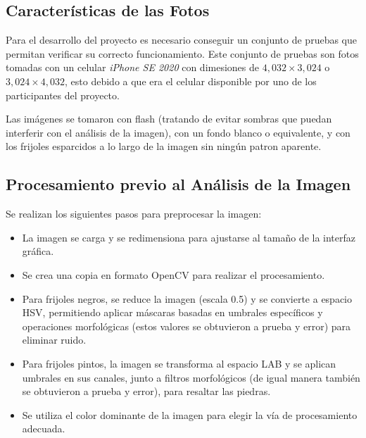 \documentclass[conference]{IEEEtran}
\begin{document}
    \subsection{Características de las Fotos}
    Para el desarrollo del proyecto es necesario conseguir un conjunto de pruebas que permitan verificar su correcto funcionamiento. Este conjunto de pruebas son fotos tomadas con un celular \textit{iPhone SE 2020}\cite{iphone} con dimesiones de $4,032 \times 3,024$ o $3,024 \times 4,032$, esto debido a que era el celular disponible por uno de los participantes del proyecto.

    Las imágenes se tomaron con flash (tratando de evitar sombras que puedan interferir con el análisis de la imagen), con un fondo blanco o equivalente, y con los frijoles esparcidos a lo largo de la imagen sin ningún patron aparente.

    \subsection{Procesamiento previo al Análisis de la Imagen}
    Se realizan los siguientes pasos para preprocesar la imagen:
    \begin{itemize}
        \item La imagen se carga y se redimensiona para ajustarse al tamaño de la interfaz gráfica.
        \item Se crea una copia en formato OpenCV para realizar el procesamiento.
        \item Para frijoles negros, se reduce la imagen (escala 0.5) y se convierte a espacio HSV, permitiendo aplicar máscaras basadas en umbrales específicos y operaciones morfológicas (estos valores se obtuvieron a prueba y error) para eliminar ruido.
        \item Para frijoles pintos, la imagen se transforma al espacio LAB y se aplican umbrales en sus canales, junto a filtros morfológicos (de igual manera también se obtuvieron a prueba y error), para resaltar las piedras.
        \item Se utiliza el color dominante de la imagen para elegir la vía de procesamiento adecuada.
    \end{itemize}
    
\end{document}
